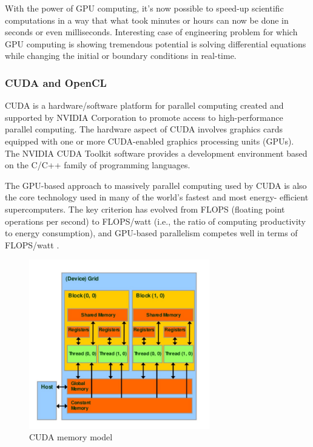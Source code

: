 With the power of GPU computing, it's now possible to speed-up scientific computations in a way that what took minutes or hours can now be done in seconds or even milliseconds. Interesting case of engineering problem for which GPU computing is showing tremendous potential is solving differential equations while changing the initial or boundary conditions in real-time.

\subsubsection{CUDA and OpenCL}

CUDA is a hardware/software platform for parallel computing created and supported by NVIDIA Corporation to promote access to high-performance parallel computing. The hardware aspect of CUDA involves graphics cards equipped with one or more CUDA-enabled graphics processing units (GPUs). The NVIDIA CUDA Toolkit software provides a development environment based on the C/C++ family of programming languages.

\cite{stortiCudaForEngineers2015}

The GPU-based approach to massively parallel computing used by CUDA is also the core technology used in many of the world’s fastest and most energy- efficient supercomputers. The key criterion has evolved from FLOPS (floating point operations per second) to FLOPS/watt (i.e., the ratio of computing productivity to energy consumption), and GPU-based parallelism competes well in terms of FLOPS/watt \citep{stortiCudaForEngineers2015}.


\citep{karimiPerformanceComparisonCUDA}

\begin{figure}[!ht]
	\centering
	\includegraphics[width=0.7\textwidth]{figures/cuda-device-memory.jpg}
	\caption{CUDA memory model}
	\label{fig:cuda-memory-model}
\end{figure}


